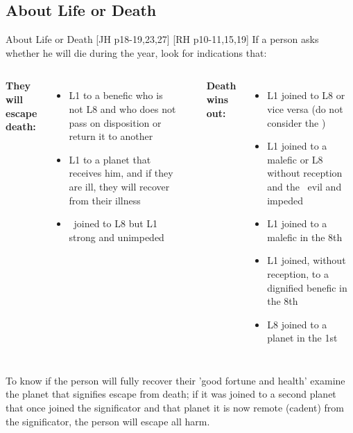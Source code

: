 \subsection{About Life or Death}
\begin{frame}[t]{About Life or Death [JH p18-19,23,27] [RH p10-11,15,19]}
If a person asks whether he will die during the year, look for indications that:\footnotemark[1]
\vspace{0.25cm}
\begin{columns}[T, onlytextwidth]
\textbf{They will escape death:}\\
\begin{itemize}
\item L1 to a benefic who is not L8 and who does not pass on disposition or return it to another 
\vspace{0.25cm}

\item L1 to a planet that receives him, and if they are ill, they will recover from their illness
\vspace{0.25cm}

\item \Moon\ joined to L8 but L1 strong and unimpeded
\end{itemize}

\rule{.1mm}{.45\textheight}

\textbf{Death wins out:}\\
\begin{itemize}
\item L1 joined to L8 or vice versa (do not consider the \Moon) 
\item L1 joined to a malefic or L8 without reception and the \Moon\ evil and impeded
\item L1 joined to a malefic in the 8th
\item L1 joined, without reception, to a dignified benefic in the 8th
\item L8 joined to a planet in the 1st
\end{itemize}
\end{columns}
\vspace{0.25cm}
To know if the person will fully recover their  'good fortune and health' examine the planet that signifies escape from death; if it was joined to a second planet that once joined the significator and that planet it is now remote (cadent) from the significator, the person will escape all harm.\footnotemark[2]

\end{frame}
